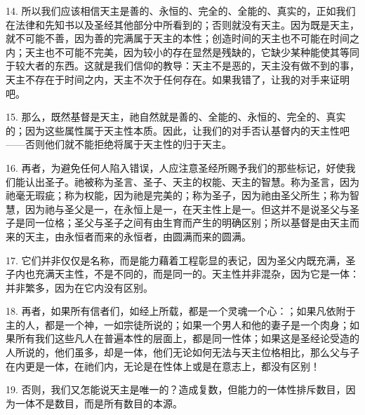 14. 所以我们应该相信天主是善的、永恒的、完全的、全能的、真实的，正如我们在法律和先知书以及圣经其他部分中所看到的；否则就没有天主。因为既是天主，就不可能不善，因为善的完满属于天主的本性；创造时间的天主也不可能在时间之内；天主也不可能不完美，因为较小的存在显然是残缺的，它缺少某种能使其等同于较大者的东西。这就是我们信仰的教导：天主不是恶的，天主没有做不到的事，天主不存在于时间之内，天主不次于任何存在。如果我错了，让我的对手来证明吧。\par

15. 那么，既然基督是天主，祂自然就是善的、全能的、永恒的、完全的、真实的；因为这些属性属于天主性本质。因此，让我们的对手否认基督内的天主性吧——否则他们就不能拒绝将属于天主性的归于天主。\par

16. 再者，为避免任何人陷入错误，人应注意圣经所赐予我们的那些标记，好使我们能认出圣子。祂被称为圣言、圣子、天主的权能、天主的智慧。称为圣言，因为祂毫无瑕疵；称为权能，因为祂是完美的；称为圣子，因为祂由圣父所生；称为智慧，因为祂与圣父是一，在永恒上是一，在天主性上是一。但这并不是说圣父与圣子是同一位格；圣父与圣子之间有由生育而产生的明确区别；所以基督是由天主而来的天主，由永恒者而来的永恒者，由圆满而来的圆满。\par

17. 它们并非仅仅是名称，而是能力藉着工程彰显的表记，因为圣父内既充满，圣子内也充满天主性，不是不同的，而是同一的。天主性并非混杂，因为它是一体：并非繁多，因为在它内没有区别。\par

18. 再者，如果所有信者们，如经上所载，都是一个灵魂一个心：；如果凡依附于主的人，都是一个神，一如宗徒所说的；如果一个男人和他的妻子是一个肉身；如果所有我们这些凡人在普遍本性的层面上，都是同一性体；如果这是圣经论受造的人所说的，他们虽多，却是一体，他们无论如何无法与天主位格相比，那么父与子在内更是一体，在祂们内，无论是在性体上或是在意志上，都没有区别！\par

19. 否则，我们又怎能说天主是唯一的？造成复数，但能力的一体性排斥数目，因为一体不是数目，而是所有数目的本源。\par

\par

